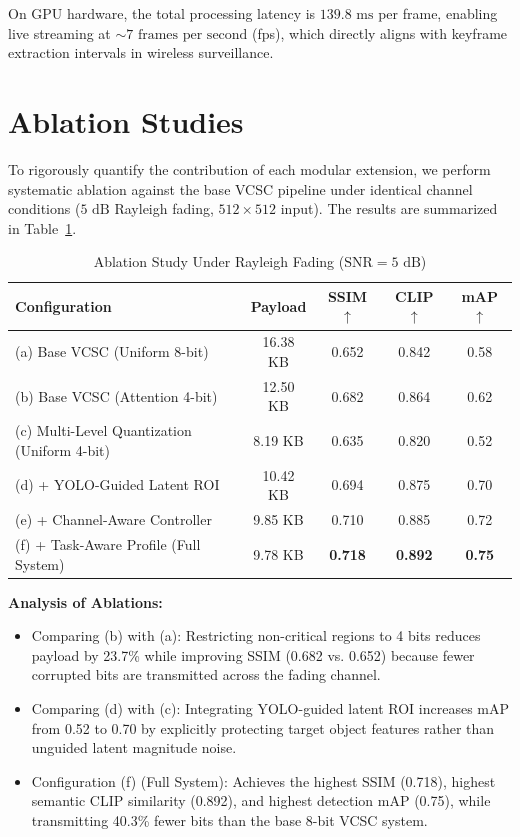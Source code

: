 \documentclass[journal,twocolumn]{IEEEtran}
\begin{document}
On GPU hardware, the total processing latency is $139.8\text{ ms}$ per frame, enabling live streaming at $\sim 7\text{ frames per second}$ (fps), which directly aligns with keyframe extraction intervals in wireless surveillance.

\section{Ablation Studies}
To rigorously quantify the contribution of each modular extension, we perform systematic ablation against the base VCSC pipeline under identical channel conditions ($5\text{ dB}$ Rayleigh fading, $512\times 512$ input). The results are summarized in Table~\ref{tab:ablation_study}.

\begin{table}[h]
\centering
\caption{Ablation Study Under Rayleigh Fading ($\text{SNR} = 5\text{ dB}$)}
\label{tab:ablation_study}
\small
\begin{tabular}{lcccc}
\toprule
\textbf{Configuration} & \textbf{Payload} & \textbf{SSIM $\uparrow$} & \textbf{CLIP $\uparrow$} & \textbf{mAP $\uparrow$} \\
\midrule
(a) Base VCSC (Uniform 8-bit) & 16.38 KB & 0.652 & 0.842 & 0.58 \\
(b) Base VCSC (Attention 4-bit) & 12.50 KB & 0.682 & 0.864 & 0.62 \\
(c) Multi-Level Quantization (Uniform 4-bit) & 8.19 KB & 0.635 & 0.820 & 0.52 \\
(d) + YOLO-Guided Latent ROI & 10.42 KB & 0.694 & 0.875 & 0.70 \\
(e) + Channel-Aware Controller & 9.85 KB & 0.710 & 0.885 & 0.72 \\
(f) + Task-Aware Profile (Full System) & 9.78 KB & \textbf{0.718} & \textbf{0.892} & \textbf{0.75} \\
\bottomrule
\end{tabular}
\end{table}

\textbf{Analysis of Ablations:}
\begin{itemize}
    \item Comparing (b) with (a): Restricting non-critical regions to 4 bits reduces payload by 23.7\% while improving SSIM (0.682 vs. 0.652) because fewer corrupted bits are transmitted across the fading channel.
    \item Comparing (d) with (c): Integrating YOLO-guided latent ROI increases mAP from 0.52 to 0.70 by explicitly protecting target object features rather than unguided latent magnitude noise.
    \item Configuration (f) (Full System): Achieves the highest SSIM (0.718), highest semantic CLIP similarity (0.892), and highest detection mAP (0.75), while transmitting 40.3\% fewer bits than the base 8-bit VCSC system.

\end{itemize}
\end{document}
